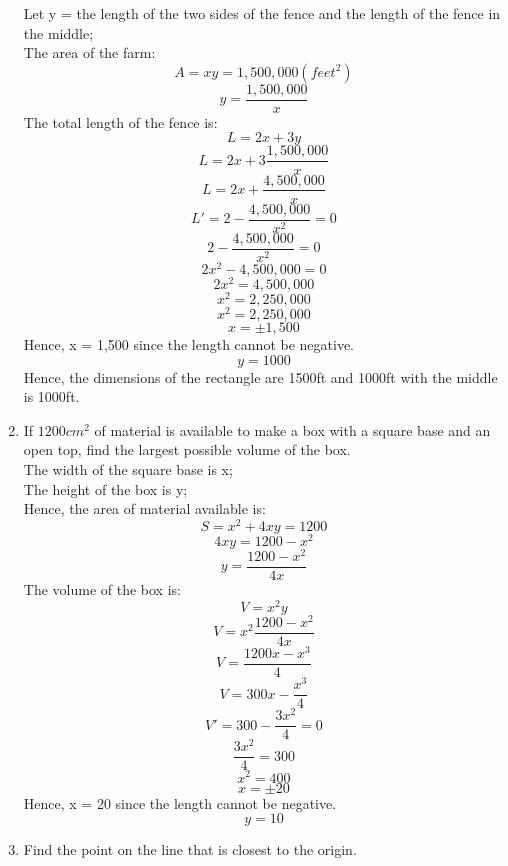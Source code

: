 \documentclass[12pt]{article}
\begin{document}
\begin{enumerate}
    Let y = the length of the two sides of the fence and the length of the fence in the middle;\\
    The area of the farm:
    \[A = xy = 1,500,000 (feet^2)\]
    \[y = \frac{1,500,000}{x}\]
    The total length of the fence is:
    \[L = 2x + 3y\]
    \[L = 2x + 3\frac{1,500,000}{x}\]
    \[L = 2x + \frac{4,500,000}{x}\]
    \[L' = 2 - \frac{4,500,000}{x^2} = 0\]
    \[2 - \frac{4,500,000}{x^2} = 0\]
    \[2x^2 - 4,500,000 = 0\]
    \[2x^2 = 4,500,000\]
    \[x^2 = 2,250,000\]
    \[x^2 = 2,250,000\]
    \[x = \pm 1,500\]
    Hence, x = 1,500 since the length cannot be negative.
    \[y = 1000\]
    Hence, the dimensions of the rectangle are 1500ft and 1000ft with the middle is 1000ft.
    \setcounter{enumi}{18}
    \item If $1200cm^2$ of material is available to make a box with a square base and an open top, find the largest possible volume of the box.\\
    The width of the square base is x;\\
    The height of the box is y;\\
    Hence, the area of material available is:
    \[S = x^2 + 4xy = 1200\]
    \[4xy = 1200 - x^2\]
    \[y = \frac{1200 - x^2}{4x}\]
    The volume of the box is:
    \[V = x^2y\]
    \[V = x^2\frac{1200 - x^2}{4x}\] 
    \[V = \frac{1200x - x^3}{4}\] 
    \[V = 300x - \frac{x^3}{4}\] 
    \[V' = 300 - \frac{3x^2}{4} = 0\] 
    \[\frac{3x^2}{4} = 300\]
    \[x^2 = 400\]
    \[x = \pm 20\]
    Hence, x = 20 since the length cannot be negative.
    \[y = 10\]
    \setcounter{enumi}{24}
    \item Find the point on the line  that is closest to the origin.
    


\end{enumerate}
\end{document}
